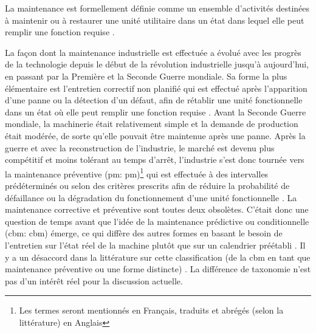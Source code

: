 La maintenance est formellement définie comme un ensemble d’activités destinées à maintenir ou à restaurer une unité utilitaire dans un état dans lequel elle peut remplir une fonction requise \cite{ISO2015}.

La façon dont la maintenance industrielle est effectuée a évolué avec les progrès de la technologie depuis le début de la révolution industrielle jusqu’à aujourd’hui, en passant par la Première et la Seconde Guerre mondiale. Sa forme la plus élémentaire est l’entretien correctif non planifié qui est effectué après l’apparition d’une panne ou la détection d’un défaut, afin de rétablir une unité fonctionnelle dans un état où elle peut remplir une fonction requise \cite{ISO2015}. Avant la Seconde Guerre mondiale, la machinerie était relativement simple et la demande de production était modérée, de sorte qu’elle pouvait être maintenue après une panne. Après la guerre et avec la reconstruction de l’industrie, le marché est devenu plus compétitif et moins tolérant au temps d’arrêt, l’industrie s’est donc tournée vers la maintenance préventive (\acrlong{pm}: \acrshort{pm})\footnote{Les termes seront mentionnés en Français, traduits et abrégés (selon la littérature) en Anglais} qui est effectuée à des intervalles prédéterminés ou selon des critères prescrits afin de réduire la probabilité de défaillance ou la dégradation du fonctionnement d’une unité fonctionnelle \cite{ISO2015}.  La maintenance corrective et préventive sont toutes deux obsolètes. %
C’était donc une question de temps avant que l’idée de la maintenance prédictive ou conditionnelle (\acrlong{cbm}: \acrshort{cbm}) émerge, ce qui diffère des autres formes en basant le besoin de l'entretien sur l’état réel de la machine plutôt que sur un calendrier préétabli \cite{Kadry2013}. Il y a un désaccord dans la littérature sur cette classification (de la \acrshort{cbm} en tant que maintenance préventive ou une forme distincte) \cite{Shin2015}. La différence de taxonomie n’est pas d’un intérêt réel pour la discussion actuelle.

